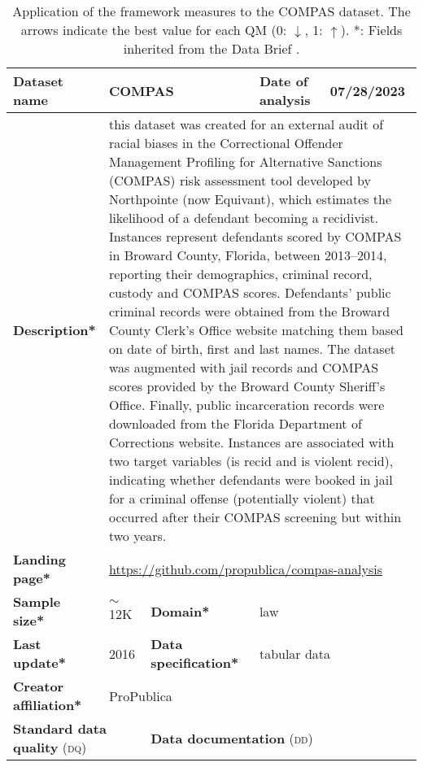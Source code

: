 \begin{table}[h]
    \caption{Application of the framework measures to the COMPAS dataset. The arrows indicate the best value for each QM (0: $\downarrow$, 1: $\uparrow$). *: Fields inherited from the Data Brief \cite{fabrisAlgorithmicFairnessDatasets2022}.}
    \label{tab:COMPAS}
    \begin{tabular}{|p{3cm}|p{1.9cm}p{3cm}p{2.6cm}p{1.6cm}|}
        \hline
        \textbf{Dataset name} & \multicolumn{2}{l|}{COMPAS} & \multicolumn{1}{l|}{\textbf{Date of analysis}} & 07/28/2023 \\ \hline
        \textbf{Description*} & \multicolumn{4}{p{10cm}|}{this dataset was created for an external audit of racial biases in the Correctional Offender Management Profiling for Alternative Sanctions (COMPAS) risk assessment tool developed by Northpointe (now Equivant), which estimates the likelihood of a defendant becoming a recidivist. Instances represent defendants scored by COMPAS in Broward County, Florida, between 2013–2014, reporting their demographics, criminal record, custody and COMPAS scores. Defendants’ public criminal records were obtained from the Broward County Clerk’s Office website matching them based on date of birth, first and last names. The dataset was augmented with jail records and COMPAS scores provided by the Broward County Sheriff’s Office. Finally, public incarceration records were downloaded from the Florida Department of Corrections website. Instances are associated with two target variables (is recid and is violent recid), indicating whether defendants were booked in jail for a criminal offense (potentially violent) that occurred after their COMPAS screening but within two years.} \\ \hline
        \textbf{Landing page*} & \multicolumn{4}{l|}{\href{https://github.com/propublica/compas-analysis}{https://github.com/propublica/compas-analysis}} \\ \hline
        \textbf{Sample size*} & $\sim$12K & \multicolumn{1}{|l}{\textbf{Domain*}} & \multicolumn{2}{|l|}{law}  \\ \hline
        \textbf{Last update*} & 2016 & \multicolumn{1}{|p{3cm}}{\textbf{Data specification*}} & \multicolumn{2}{|l|}{tabular data} \\ \hline
        \textbf{Creator affiliation*} & \multicolumn{4}{l|}{ProPublica} \\ \hline\hline
        \multicolumn{2}{|l|}{\textbf{Standard data quality} (\textsc{dq})} & \multicolumn{3}{|l|}{\textbf{Data documentation} (\textsc{dd})}\\ \hline

\end{tabular}
\end{table}
